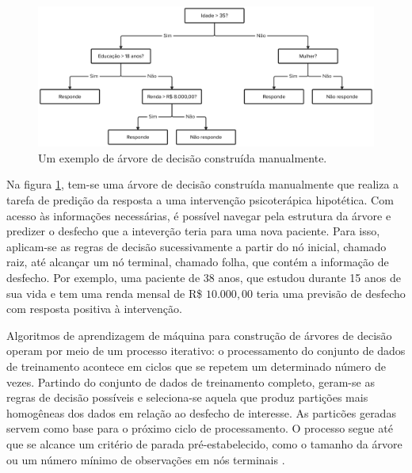 \begin{figure}[h!]
    \centering
    \includegraphics[width=\textwidth]{./03-exemplo/imagens/arvore-exemplo.png}
    \caption{Um exemplo de árvore de decisão construída manualmente.}
    \label{fig:arvore-exemplo}
\end{figure}

Na figura \ref{fig:arvore-exemplo}, tem-se uma árvore de decisão construída manualmente que realiza a tarefa de predição da resposta a uma intervenção psicoterápica hipotética.
Com acesso às informações necessárias, é possível navegar pela estrutura da árvore e predizer o desfecho que a inteverção teria para uma nova paciente. Para isso, aplicam-se
as regras de decisão sucessivamente a partir do nó inicial, chamado raiz, até alcançar um nó terminal, chamado folha, que contém a informação de desfecho.  Por exemplo,
uma paciente de 38 anos, que estudou durante 15 anos de sua vida e tem uma renda mensal de R\$ $10.000,00$ teria uma previsão de desfecho com resposta positiva à intervenção.

Algoritmos de aprendizagem de máquina para construção de árvores de decisão operam por meio de um processo iterativo: o processamento do conjunto de dados de treinamento
acontece em ciclos que se repetem um determinado número de vezes. Partindo do conjunto de dados de treinamento completo, geram-se as regras de decisão possíveis e seleciona-se
aquela que produz partições mais homogêneas dos dados em relação ao desfecho de interesse. As particões geradas servem como base para o próximo ciclo de processamento. O processo
segue até que se alcance um critério de parada pré-estabelecido, como o tamanho da árvore ou um número mínimo de observações em nós terminais \cite{Bi2019}.

